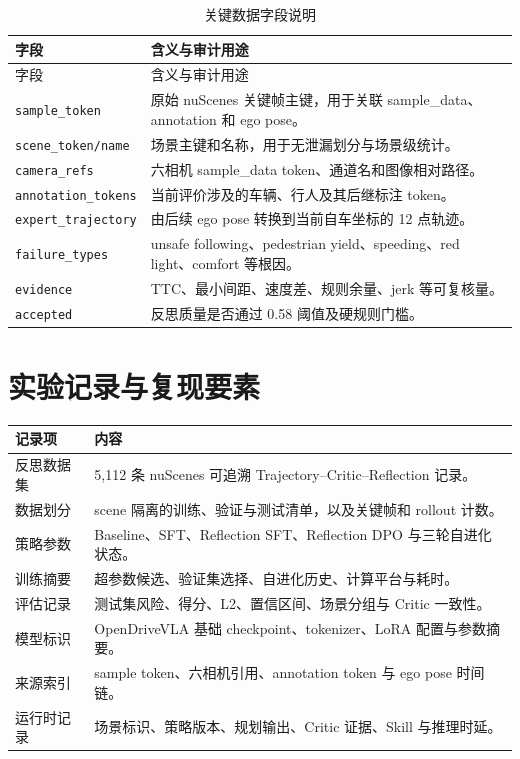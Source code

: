 \documentclass[UTF8,a4paper,12pt,fontset=fandol]{ctexart}
\renewcommand{\arraystretch}{1.20}
\begin{document}
{\footnotesize
\renewcommand{\arraystretch}{1.05}
\begin{longtable}{P{0.22\textwidth}P{0.64\textwidth}}
\caption{关键数据字段说明}\\
\toprule
字段 & 含义与审计用途 \\
\midrule
\endfirsthead
\toprule 字段 & 含义与审计用途 \\
\midrule
\endhead
\bottomrule
\endfoot
\texttt{sample\_token} & 原始 nuScenes 关键帧主键，用于关联 sample\_data、annotation 和 ego pose。\\
\texttt{scene\_token/name} & 场景主键和名称，用于无泄漏划分与场景级统计。\\
\texttt{camera\_refs} & 六相机 sample\_data token、通道名和图像相对路径。\\
\texttt{annotation\_tokens} & 当前评价涉及的车辆、行人及其后继标注 token。\\
\texttt{expert\_trajectory} & 由后续 ego pose 转换到当前自车坐标的 12 点轨迹。\\
\texttt{failure\_types} & unsafe following、pedestrian yield、speeding、red light、comfort 等根因。\\
\texttt{evidence} & TTC、最小间距、速度差、规则余量、jerk 等可复核量。\\
\texttt{accepted} & 反思质量是否通过 0.58 阈值及硬规则门槛。\\
\end{longtable}
}

\section{实验记录与复现要素}
\begingroup
\small
\setlength{\parskip}{0.25em}
\begin{center}
\scriptsize
\renewcommand{\arraystretch}{0.96}
\begin{tabular}{P{0.29\textwidth}P{0.57\textwidth}}
\toprule
记录项 & 内容 \\
\midrule
反思数据集 & 5,112 条 nuScenes 可追溯 Trajectory--Critic--Reflection 记录。\\
数据划分 & scene 隔离的训练、验证与测试清单，以及关键帧和 rollout 计数。\\
策略参数 & Baseline、SFT、Reflection SFT、Reflection DPO 与三轮自进化状态。\\
训练摘要 & 超参数候选、验证集选择、自进化历史、计算平台与耗时。\\
评估记录 & 测试集风险、得分、L2、置信区间、场景分组与 Critic 一致性。\\
模型标识 & OpenDriveVLA 基础 checkpoint、tokenizer、LoRA 配置与参数摘要。\\
来源索引 & sample token、六相机引用、annotation token 与 ego pose 时间链。\\
运行时记录 & 场景标识、策略版本、规划输出、Critic 证据、Skill 与推理时延。\\
\bottomrule
\end{tabular}
\end{center}
\end{document}
